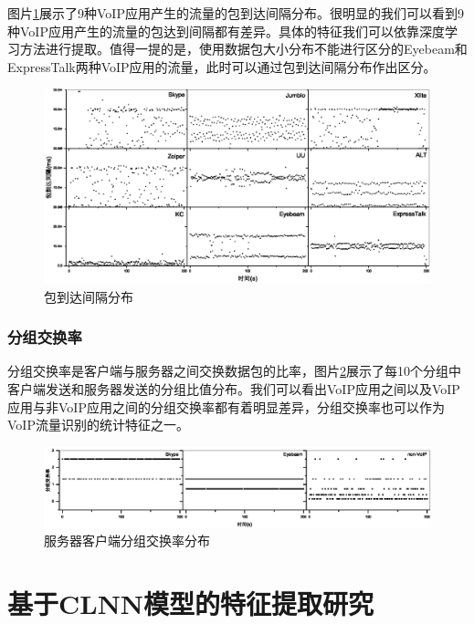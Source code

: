 图片\ref{fig:itd}展示了9种VoIP应用产生的流量的包到达间隔分布。很明显的我们可以看到9种VoIP应用产生的流量的包达到间隔都有差异。具体的特征我们可以依靠深度学习方法进行提取。值得一提的是，使用数据包大小分布不能进行区分的Eyebeam和ExpressTalk两种VoIP应用的流量，此时可以通过包到达间隔分布作出区分。


\begin{figure}[thb]
\begin{center}
\includegraphics[width=1\textwidth]{figures/itd.eps}
\caption{包到达间隔分布}\label{fig:itd}
\end{center}
\end{figure}

\subsubsection{分组交换率}
分组交换率是客户端与服务器之间交换数据包的比率，图片\ref{fig:rate}展示了每10个分组中客户端发送和服务器发送的分组比值分布。我们可以看出VoIP应用之间以及VoIP应用与非VoIP应用之间的分组交换率都有着明显差异，分组交换率也可以作为VoIP流量识别的统计特征之一。


\begin{figure}[thb]
\begin{center}
\includegraphics[width=1\textwidth]{figures/rate.eps}
\caption{服务器客户端分组交换率分布}\label{fig:rate}
\end{center}
\end{figure}

\section{基于CLNN模型的特征提取研究}
